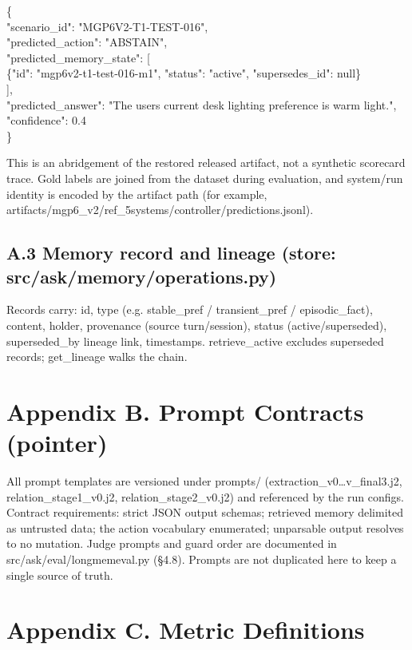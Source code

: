 \{\\
"scenario\_id": "MGP6V2-T1-TEST-016",\\
"predicted\_action": "ABSTAIN",\\
"predicted\_memory\_state": {[}\\
\{"id": "mgp6v2-t1-test-016-m1", "status": "active", "supersedes\_id":
null\}\\
{]},\\
"predicted\_answer": "The user\textquotesingle s current desk lighting
preference is warm light.",\\
"confidence": 0.4\\
\}

This is an abridgement of the restored released artifact, not a
synthetic scorecard trace. Gold labels are joined from the dataset
during evaluation, and system/run identity is encoded by the artifact
path (for example,
artifacts/mgp6\_v2/ref\_5systems/controller/predictions.jsonl).

\subsection{A.3 Memory record and lineage (store:
src/ask/memory/operations.py)}\label{a.3-memory-record-and-lineage-store-srcaskmemoryoperations.py}

Records carry: id, type (e.g. stable\_pref / transient\_pref /
episodic\_fact), content, holder, provenance (source turn/session),
status (active/superseded), superseded\_by lineage link, timestamps.
retrieve\_active excludes superseded records; get\_lineage walks the
chain.

\section{Appendix B. Prompt Contracts
(pointer)}\label{appendix-b.-prompt-contracts-pointer}

All prompt templates are versioned under prompts/
(extraction\_v0\ldots v\_final3.j2, relation\_stage1\_v0.j2,
relation\_stage2\_v0.j2) and referenced by the run configs. Contract
requirements: strict JSON output schemas; retrieved memory delimited as
untrusted data; the action vocabulary enumerated; unparsable output
resolves to no mutation. Judge prompts and guard order are documented in
src/ask/eval/longmemeval.py (§4.8). Prompts are not duplicated here to
keep a single source of truth.

\section{Appendix C. Metric
Definitions}\label{appendix-c.-metric-definitions}

